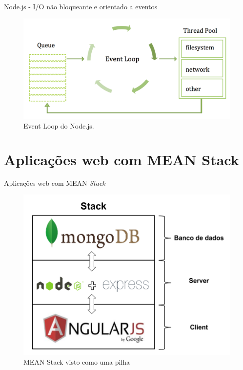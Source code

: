 \documentclass{beamer}
\begin{document}
\begin{frame}{Node.js - I/O não bloqueante e orientado a eventos}
    \begin{figure}[htb]
    \centering
    \includegraphics[scale=0.25]{../images/node_event_loop.png}
    \caption{Event Loop do Node.js.}
    \label{fig: node_el}
    \end{figure}
\end{frame}


\section{Aplicações web com MEAN Stack} 

\begin{frame}{Aplicações web com MEAN \textit{Stack}}
    \begin{figure}[htb]
    \centering
    \includegraphics[scale=0.25]{../images/mean_stack_diagram.png}
    \caption{MEAN Stack visto como uma pilha}
    \label{fig: mean_diag}
    \end{figure}
\end{frame}
\end{document}
